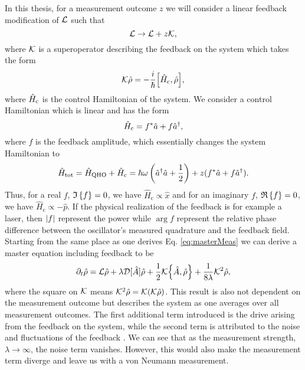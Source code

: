 In this thesis, for a measurement outcome $z$ we will consider a linear feedback modification of $\mathcal{L}$ such that 
\begin{equation}
    \mathcal{L} \to \mathcal{L} + z \mathcal{K},
\end{equation}  
where $\mathcal{K}$ is a superoperator describing the feedback on the system \cite{Annby-Andersson:2024} which takes the form
\begin{equation}
    \feedback\dmatrix = - \frac{i}{\hbar} \comm{\hamiltonian_\mathrm{c}}{\dmatrix},
\end{equation}
where $\hat{H}_\mathrm{c}$ is the control Hamiltonian of the system. We consider a control Hamiltonian which is linear and has the form
\begin{equation}
    \hat{H}_\mathrm{c} = f^* \hat{a} + f \hat{a}^{\dagger},
\end{equation}
where $f$ is the feedback amplitude, which essentially changes the system Hamiltonian to
\begin{equation}
    \hat{H}_\text{tot} = \hat{H}_\text{QHO} + \hat{H}_\text{c} =\hbar\omega\left(\hat{a}^{\dagger}\hat{a} + \frac{1}{2}\right) + z(f^* \hat{a} + f \hat{a}^{\dagger}).
\end{equation}
Thus, for a real $f$, $\mathfrak{I}\left\{f\right\} = 0$, we have $\hat{H}_\text{c} \propto \hat{x}$ and for an imaginary $f$, $\mathfrak{R}\left\{f\right\} = 0$, we have $\hat{H}_\text{c} \propto -\hat{p}$. If the physical realization of the feedback is for example a laser, then $\abs{f}$ represent the power while $\arg{f}$ represent the relative phase difference between the oscillator's measured quadrature and the feedback field. Starting from the same place as one derives Eq. \eqref{eq:masterMeas} we can derive a master equation including feedback \cite{Annby-Andersson:2024} to be
\begin{equation}
    \dt\dmatrix = \liouvillian\dmatrix + \lambda \super{\hat{A}} \dmatrix + \frac{1}{2} \feedback \acomm{\hat{A}}{\dmatrix} + \frac{1}{8\lambda} \feedback^2 \dmatrix, \label{eq:masterFeed}
\end{equation}
where the square on $\mathcal{K}$ means $ \mathcal{K}^2 \hat{\rho} = \mathcal{K} ( \mathcal{K} \hat{\rho})$. This result is also not dependent on the measurement outcome but describes the system as one averages over all measurement outcomes. The first additional term introduced is the drive arising from the feedback on the system, while the second term is attributed to the noise and fluctuations of the feedback \cite{Annby-Andersson:2024}. We can see that as the measurement strength, $\lambda \to \infty$, the noise term vanishes. However, this would also make the measurement term diverge and leave us with a von Neumann measurement.
